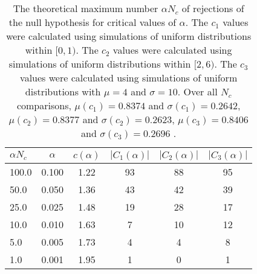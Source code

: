 \begin{table}[h!]
\begin{center}
\begin{tabular}{| l | c | c | c | c | c |}\hline
$\alpha N_c$ & $\alpha$ & $c(\alpha)$ & $|C_1(\alpha)|$ & $|C_2(\alpha)|$ & $|C_3(\alpha)|$ \\\hline
100.0 & 0.100 & 1.22 & 93 & 88 & 95 \\\hline
50.0 & 0.050 & 1.36 & 43 & 42 & 39 \\\hline
25.0 & 0.025 & 1.48 & 19 & 28 & 17 \\\hline
10.0 & 0.010 & 1.63 & 7 & 10 & 12 \\\hline
5.0 & 0.005 & 1.73 & 4 & 4 & 8 \\\hline
1.0 & 0.001 & 1.95 & 1 & 0 & 1 \\\hline
\end{tabular}
\caption{The theoretical maximum number $\alpha N_c$ of rejections
of the null hypothesis for critical values of $\alpha$.
The $c_1$ values were calculated using simulations of uniform distributions within $[0,1)$.
The $c_2$ values were calculated using simulations of uniform distributions within $[2,6)$.
The $c_3$ values were calculated using simulations of uniform distributions with $\mu=4$ and $\sigma=10$.
Over all $N_c$ comparisons,
 $\mu(c_1)=0.8374$ and $\sigma(c_1)=0.2642$,
 $\mu(c_2)=0.8377$ and $\sigma(c_2)=0.2623$,
 $\mu(c_3)=0.8406$ and $\sigma(c_3)=0.2696$ .
}
\end{center}
\end{table}